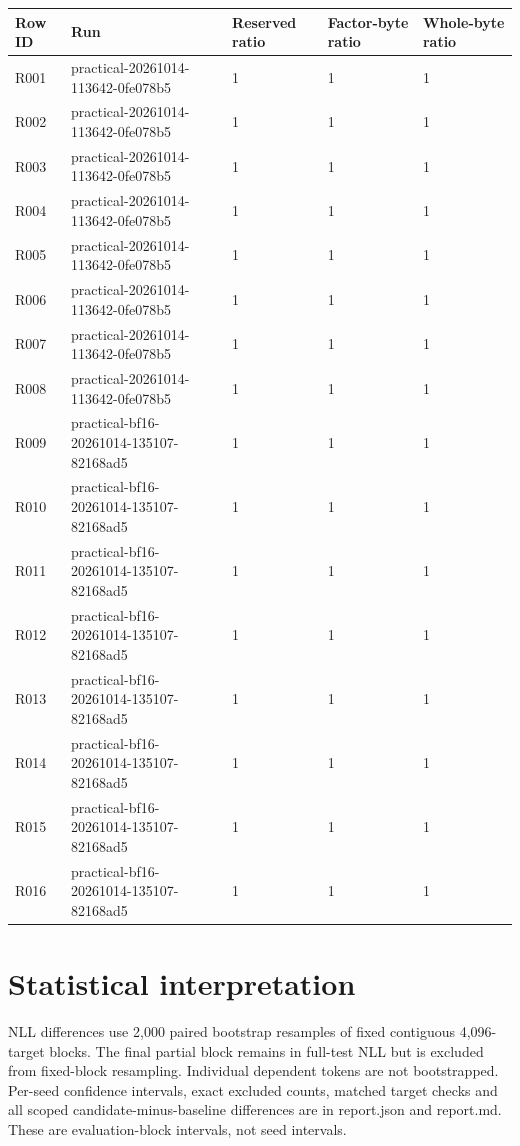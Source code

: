 \documentclass[10pt]{article}
\begin{document}
{\scriptsize\setlength{\tabcolsep}{2pt}
\begin{longtable}{p{}p{}p{}p{}p{}}
Row ID & Run & Reserved ratio & Factor-byte ratio & Whole-byte ratio \\
\hline\endhead
R001 & practical-20261014-113642-0fe078b5 & 1 & 1 & 1 \\
R002 & practical-20261014-113642-0fe078b5 & 1 & 1 & 1 \\
R003 & practical-20261014-113642-0fe078b5 & 1 & 1 & 1 \\
R004 & practical-20261014-113642-0fe078b5 & 1 & 1 & 1 \\
R005 & practical-20261014-113642-0fe078b5 & 1 & 1 & 1 \\
R006 & practical-20261014-113642-0fe078b5 & 1 & 1 & 1 \\
R007 & practical-20261014-113642-0fe078b5 & 1 & 1 & 1 \\
R008 & practical-20261014-113642-0fe078b5 & 1 & 1 & 1 \\
R009 & practical-bf16-20261014-135107-82168ad5 & 1 & 1 & 1 \\
R010 & practical-bf16-20261014-135107-82168ad5 & 1 & 1 & 1 \\
R011 & practical-bf16-20261014-135107-82168ad5 & 1 & 1 & 1 \\
R012 & practical-bf16-20261014-135107-82168ad5 & 1 & 1 & 1 \\
R013 & practical-bf16-20261014-135107-82168ad5 & 1 & 1 & 1 \\
R014 & practical-bf16-20261014-135107-82168ad5 & 1 & 1 & 1 \\
R015 & practical-bf16-20261014-135107-82168ad5 & 1 & 1 & 1 \\
R016 & practical-bf16-20261014-135107-82168ad5 & 1 & 1 & 1 \\
\end{longtable}}

\section{Statistical interpretation}

NLL differences use 2,000 paired bootstrap resamples of fixed contiguous 4,096-target blocks. The final partial block remains in full-test NLL but is excluded from fixed-block resampling. Individual dependent tokens are not bootstrapped. Per-seed confidence intervals, exact excluded counts, matched target checks and all scoped candidate-minus-baseline differences are in report.json and report.md. These are evaluation-block intervals, not seed intervals.
\end{document}
